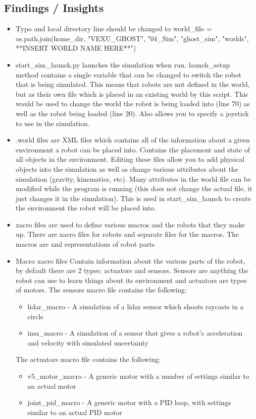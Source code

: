 \subsection*{Findings / Insights}
\begin{itemize}
    \item Typo and local directory line should be changed to world\_file = os.path.join(home\_dir, "VEXU\_GHOST", "04\_Sim", "ghost\_sim", "worlds", **INSERT WORLD NAME HERE**")
    \item start\_sim\_launch.py launches the simulation when run. launch\_setup method contains a single variable that can be changed to switch the robot that is being simulated. This means that robots are not defined in the world, but as their own file which is placed in an existing world by this script. This would be used to change the world the robot is being loaded into (line 70) as well as the robot being loaded (line 20). Also allows you to specify a joystick to use in the simulation.
    \item .world files are XML files which contains all of the information about a given environment a robot can be placed into. Contains the placement and state of all objects in the environment. Editing these files allow you to add physical objects into the simulation as well as change various attributes about the simulation (gravity, kinematics, etc). Many attributes in the world file can be modified while the program is running (this does not change the actual file, it just changes it in the simulation). This is used in start\_sim\_launch to create the environment the robot will be placed into.
    \item xacro files are used to define various macros and the robots that they make up. There are xacro files for robots and separate files for the macros. The macros are xml representations of robot parts
    \item Macro xacro files Contain information about the various parts of the robot, by default there are 2 types: actuators and sensors. Sensors are anything the robot can use to learn things about its environment and actuators are types of motors. The sensors macro file contains the following: 
    \begin{itemize}
        \item lidar\_macro - A simulation of a lidar sensor which shoots raycasts in a circle 
        \item imu\_macro - A simulation of a sensor that gives a robot's acceleration and velocity with simulated uncertainty
    \end{itemize}
    The actuators macro file contains the following: 
    \begin{itemize}
        \item v5\_motor\_macro - A generic motor with a number of settings similar to an actual motor
        \item joint\_pid\_macro - A generic motor with a PID loop, with settings similar to an actual PID motor
    \end{itemize}
\end{itemize}
